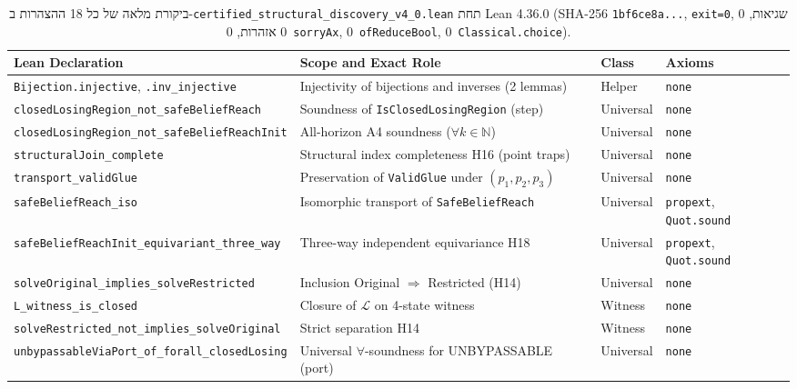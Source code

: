 \documentclass[10pt,a4paper]{article}
\newcommand{\code}[1]{\foreignlanguage{english}{\nolinkurl{#1}}}
\newcommand{\ltr}[1]{\foreignlanguage{english}{#1}}
\begin{document}
\begin{table}[!htbp]
\centering
\caption{ביקורת מלאה של כל 18 ההצהרות ב-\code{certified_structural_discovery_v4_0.lean} תחת \ltr{Lean 4.36.0} (\ltr{SHA-256} \code{1bf6ce8a...}, \code{exit=0}, 0 שגיאות, 0 אזהרות, 0~\code{sorryAx}, 0~\code{ofReduceBool}, 0~\code{Classical.choice}).}
\label{tab:lean-audit}
\footnotesize
\renewcommand{\arraystretch}{1.12}
\begin{otherlanguage}{english}
\begin{tabularx}{\linewidth}{@{}>{\raggedright\arraybackslash}p{6.5cm}>{\raggedright\arraybackslash}Xll@{}}
\toprule
\textbf{Lean Declaration} & \textbf{Scope and Exact Role} & \textbf{Class} & \textbf{Axioms} \\
\midrule
\nolinkurl{Bijection.injective}, \nolinkurl{.inv_injective} & Injectivity of bijections and inverses (2 lemmas) & Helper & \nolinkurl{none} \\
\nolinkurl{closedLosingRegion_not_safeBeliefReach} & Soundness of \nolinkurl{IsClosedLosingRegion} (step) & Universal & \nolinkurl{none} \\
\nolinkurl{closedLosingRegion_not_safeBeliefReachInit} & All-horizon A4 soundness ($\forall k \in \mathbb{N}$) & Universal & \nolinkurl{none} \\
\nolinkurl{structuralJoin_complete} & Structural index completeness H16 (point traps) & Universal & \nolinkurl{none} \\
\nolinkurl{transport_validGlue} & Preservation of \nolinkurl{ValidGlue} under $(p_1, p_2, p_3)$ & Universal & \nolinkurl{none} \\
\nolinkurl{safeBeliefReach_iso} & Isomorphic transport of \nolinkurl{SafeBeliefReach} & Universal & \texttt{propext}, \texttt{Quot.sound} \\
\nolinkurl{safeBeliefReachInit_equivariant_three_way} & Three-way independent equivariance H18 & Universal & \texttt{propext}, \texttt{Quot.sound} \\
\nolinkurl{solveOriginal_implies_solveRestricted} & Inclusion Original $\Rightarrow$ Restricted (H14) & Universal & \nolinkurl{none} \\
\nolinkurl{L_witness_is_closed} & Closure of $\mathcal{L}$ on 4-state witness & Witness & \nolinkurl{none} \\
\nolinkurl{solveRestricted_not_implies_solveOriginal} & Strict separation H14 & Witness & \nolinkurl{none} \\
\nolinkurl{unbypassableViaPort_of_forall_closedLosing} & Universal $\forall$-soundness for UNBYPASSABLE (port) & Universal & \nolinkurl{none} \\

\end{tabularx}
\end{otherlanguage}
\end{table}
\end{document}
